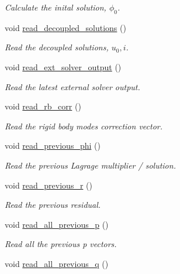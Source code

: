 \begin{DoxyCompactItemize}
\begin{DoxyCompactList}\small\item\em Calculate the inital solution, $\phi_0$. \end{DoxyCompactList}\item 
void \hyperlink{classcarl_1_1_f_e_t_i___operations_a21f21442d768b053c891e832f31a7d6e}{read\+\_\+decoupled\+\_\+solutions} ()
\begin{DoxyCompactList}\small\item\em Read the decoupled solutions, $ u_0,i$. \end{DoxyCompactList}\item 
void \hyperlink{classcarl_1_1_f_e_t_i___operations_ad925f9a61ac106d011e3b05f47fd3afe}{read\+\_\+ext\+\_\+solver\+\_\+output} ()
\begin{DoxyCompactList}\small\item\em Read the latest external solver output. \end{DoxyCompactList}\item 
void \hyperlink{classcarl_1_1_f_e_t_i___operations_a33e80968b86803c9e4dc388bcfdb23d7}{read\+\_\+rb\+\_\+corr} ()
\begin{DoxyCompactList}\small\item\em Read the rigid body modes correction vector. \end{DoxyCompactList}\item 
void \hyperlink{classcarl_1_1_f_e_t_i___operations_a7a6171a43ee7325245c5dfc0cde63cbc}{read\+\_\+previous\+\_\+phi} ()
\begin{DoxyCompactList}\small\item\em Read the previous Lagrage multiplier / solution. \end{DoxyCompactList}\item 
void \hyperlink{classcarl_1_1_f_e_t_i___operations_ad1eaddadddc43ef7e666a31028c8de3e}{read\+\_\+previous\+\_\+r} ()
\begin{DoxyCompactList}\small\item\em Read the previous residual. \end{DoxyCompactList}\item 
void \hyperlink{classcarl_1_1_f_e_t_i___operations_a6c9eb129b4f4818d66d164edd140fa6e}{read\+\_\+all\+\_\+previous\+\_\+p} ()
\begin{DoxyCompactList}\small\item\em Read all the previous {\ttfamily p} vectors. \end{DoxyCompactList}\item 
void \hyperlink{classcarl_1_1_f_e_t_i___operations_ab0897275bdbd8f8859e4b47e34adbf63}{read\+\_\+all\+\_\+previous\+\_\+q} ()

\end{DoxyCompactItemize}
